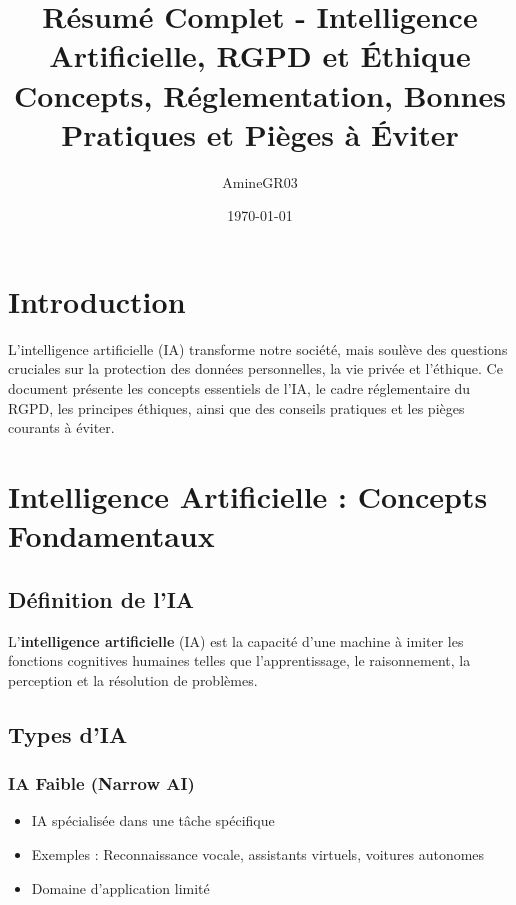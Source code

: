 \documentclass[11pt,a4paper]{article}
\title{Résumé Complet - Intelligence Artificielle, RGPD et Éthique\\
\large Concepts, Réglementation, Bonnes Pratiques et Pièges à Éviter}
\author{AmineGR03}
\date{\today}
\begin{document}
\maketitle

\tableofcontents
\newpage

\section{Introduction}

L'intelligence artificielle (IA) transforme notre société, mais soulève des questions cruciales sur la protection des données personnelles, la vie privée et l'éthique. Ce document présente les concepts essentiels de l'IA, le cadre réglementaire du RGPD, les principes éthiques, ainsi que des conseils pratiques et les pièges courants à éviter.

\section{Intelligence Artificielle : Concepts Fondamentaux}

\subsection{Définition de l'IA}

\begin{definitionbox}
L'\textbf{intelligence artificielle} (IA) est la capacité d'une machine à imiter les fonctions cognitives humaines telles que l'apprentissage, le raisonnement, la perception et la résolution de problèmes.
\end{definitionbox}

\subsection{Types d'IA}

\subsubsection{IA Faible (Narrow AI)}
\begin{itemize}
    \item IA spécialisée dans une tâche spécifique
    \item Exemples : Reconnaissance vocale, assistants virtuels, voitures autonomes
    \item Domaine d'application limité
\end{itemize}
\end{document}
